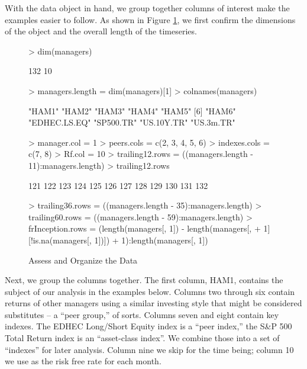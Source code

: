 \documentclass[12pt,letterpaper,english]{article}
\begin{document}
With the data object in hand, we group together columns of interest
make the examples easier to follow. As shown in Figure \ref{fig:Assess-and-Organize},
we first confirm the dimensions of the object and the overall length
of the timeseries.

%
\begin{figure}

\caption{Assess and Organize the Data}

\label{fig:Assess-and-Organize}

\begin{center}

\begin{Schunk}
\begin{Sinput}
> dim(managers)
\end{Sinput}
\begin{Soutput}
[1] 132  10
\end{Soutput}
\begin{Sinput}
> managers.length = dim(managers)[1]
> colnames(managers)
\end{Sinput}
\begin{Soutput}
 [1] "HAM1"        "HAM2"        "HAM3"        "HAM4"        "HAM5"       
 [6] "HAM6"        "EDHEC.LS.EQ" "SP500.TR"    "US.10Y.TR"   "US.3m.TR"   
\end{Soutput}
\begin{Sinput}
> manager.col = 1
> peers.cols = c(2, 3, 4, 5, 6)
> indexes.cols = c(7, 8)
> Rf.col = 10
> trailing12.rows = ((managers.length - 11):managers.length)
> trailing12.rows
\end{Sinput}
\begin{Soutput}
 [1] 121 122 123 124 125 126 127 128 129 130 131 132
\end{Soutput}
\begin{Sinput}
> trailing36.rows = ((managers.length - 35):managers.length)
> trailing60.rows = ((managers.length - 59):managers.length)
> frInception.rows = (length(managers[, 1]) - length(managers[, 
+     1][!is.na(managers[, 1])]) + 1):length(managers[, 1])
\end{Sinput}
\end{Schunk}

\end{center}
\end{figure}


Next, we group the columns together. The first column, HAM1, contains
the subject of our analysis in the examples below. Columns two through
six contain returns of other managers using a similar investing style
that might be considered substitutes -- a {}``peer group,'' of sorts.
Columns seven and eight contain key indexes. The EDHEC Long/Short
Equity index is a {}``peer index,'' the S\&P 500 Total Return index
is an {}``asset-class index''. We combine those into a set of {}``indexes''
for later analysis. Column nine we skip for the time being; column
10 we use as the risk free rate for each month.
\end{document}
